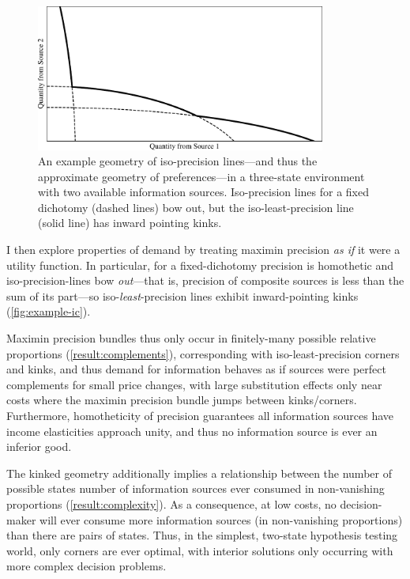\documentclass{fancyArticle}
\renewcommand{\|}{\,|\,}                    %
\providecommand{\;}{\,;}                    %
\begin{document}
\begin{figure}[t]
  \centering
  \includegraphics[width=0.85\textwidth]{figures/figqualitative.pdf}
  \caption{%
    An example geometry of iso-precision lines---and thus the approximate geometry of preferences---in a three-state environment with two available information sources.
    Iso-precision lines for a fixed dichotomy (dashed lines) bow out, but the iso-least-precision line (solid line) has inward pointing kinks.
  }\label{fig:example-ic}
\end{figure}

I then explore properties of demand by treating maximin precision \textit{as if} it were a utility function.
In particular, for a fixed-dichotomy precision is homothetic and iso-precision-lines bow \textit{out}---that is, precision of composite sources is less than the sum of its part---so iso-\textit{least}-precision lines exhibit inward-pointing kinks (\autoref{fig:example-ic}).

Maximin precision bundles thus only occur in finitely-many possible relative proportions (\autoref{result:complements}), corresponding with iso-least-precision corners and kinks, and thus demand for information behaves as if sources were perfect complements for small price changes, with large substitution effects only near costs where the maximin precision bundle jumps between kinks/corners.
Furthermore, homotheticity of precision guarantees all information sources have income elasticities approach unity, and thus no information source is ever an inferior good.

The kinked geometry additionally implies a relationship between the number of possible states number of information sources ever consumed in non-vanishing proportions (\autoref{result:complexity}).
As a consequence, at low costs, no decision-maker will ever consume more information sources (in non-vanishing proportions) than there are pairs of states.
Thus, in the simplest, two-state hypothesis testing world, only corners are ever optimal, with interior solutions only occurring with more complex decision problems.
\end{document}
